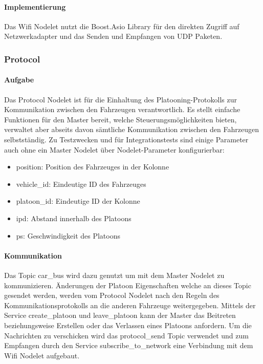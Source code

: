 \documentclass[a4paper, 12pt, titlepage]{scrartcl}
\begin{document}
				\paragraph{Implementierung} Das Wifi Nodelet nutzt die Boost.Asio Library für den direkten Zugriff auf Netzwerkadapter und das Senden und Empfangen von UDP Paketen.
				
			
				\subsubsection{Protocol}
				\label{sw_b_protocol}
				\paragraph{Aufgabe} Das Protocol Nodelet ist für die Einhaltung des Platooning-Protokolls zur Kommunikation zwischen den Fahrzeugen verantwortlich. Es stellt einfache Funktionen für den Master bereit, welche Steuerungsmöglichkeiten bieten, verwaltet aber abseits davon sämtliche Kommunikation zwischen den Fahrzeugen selbstständig. Zu Testzwecken und für Integrationstests sind einige Parameter auch ohne ein Master Nodelet über Nodelet-Parameter konfigurierbar:
				\begin{itemize}
					\item position: Position des Fahrzeuges in der Kolonne
					\item vehicle\_id: Eindeutige ID des Fahrzeuges
					\item platoon\_id: Eindeutige ID der Kolonne
					\item ipd: Abstand innerhalb des Platoons
					\item ps: Geschwindigkeit des Platoons
				\end{itemize}
				
				\paragraph{Kommunikation} Das Topic car\_bus wird dazu genutzt um mit dem Master Nodelet zu kommunizieren. Änderungen der Platoon Eigenschaften welche an dieses Topic gesendet werden, werden vom Protocol Nodelet nach den Regeln des Kommunikationsprotokolls an die anderen Fahrzeuge weitergegeben. Mittels der Service create\_platoon und leave\_platoon kann der Master das Beitreten beziehungsweise Erstellen oder das Verlassen eines Platoons anfordern. Um die Nachrichten zu verschicken wird das protocol\_send Topic verwendet und zum Empfangen durch den Service subscribe\_to\_network eine Verbindung mit dem Wifi Nodelet aufgebaut.
				
\end{document}
